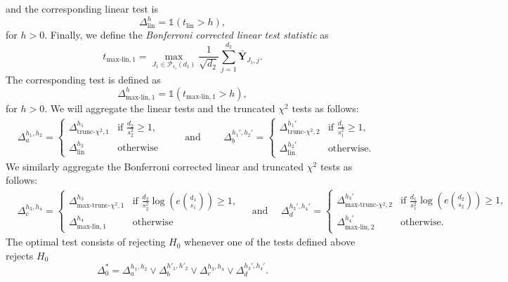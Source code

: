 \documentclass{article}
\newcommand{\Y}{\mathbf{Y}}
\newcommand{\one}{\mathds{1}}
\newcommand{\lin}{\text{lin}}
\newcommand{\chisqlin}{\text{trunc-$\chi^2$}}
\newcommand{\chisqmax}{\text{max-trunc-$\chi^2$}}
\newcommand{\linmax}{\text{max-lin}}
\theoremstyle{remark}
\begin{document}
and the corresponding linear test is
\begin{equation}
    \Delta^h_{\lin} = \one(t_\lin > h),
\end{equation}
for $h > 0$.
Finally, we define the \textit{Bonferroni corrected linear test statistic} as
\begin{equation}\label{eq_lin_max}
    \displaystyle t_{\linmax, 1} = \max_{J_1 \in \mathcal P_{s_1}\!(d_1)}\frac{1}{\sqrt{d_2}}\sum_{j = 1}^{d_2}\bar{\Y}_{J_1, j}.
\end{equation}
The corresponding test is defined as 
\begin{equation}
\Delta_{\linmax, 1}^h = \one(t_{\linmax, 1} > h),
\end{equation}
for $h > 0$. We will aggregate the linear tests and the truncated $\chi^2$ tests as follows:
\begin{align}
    &\Delta_a^{h_1,h_2} = \begin{cases}
        \Delta^{h_1}_{\chisqlin, 1} & \text{if  $\frac{d_2}{s_2^2} \geq 1$,} \\ \Delta^{h_2}_{\lin} & \text{otherwise}
    \end{cases} \qquad \text{ and } 
    \qquad \Delta_b^{h_1',h_2'} = \begin{cases}
        \Delta^{h_1'}_{\chisqlin, 2} & \text{if  $\frac{d_1}{s_1^2} \geq 1$,} \\ \Delta^{h_2'}_{\lin} & \text{otherwise.}
    \end{cases} \label{def_Delta_a_and_b}
\end{align}
We similarly aggregate the Bonferroni corrected linear and truncated $\chi^2$ tests as follows:
\begin{align*}
    &\Delta_c^{h_3,h_4} = \begin{cases}
        \Delta^{h_3}_{\chisqmax, 1} & \text{if  $\frac{d_2}{s_2^2}\log\!\left(e{d_1 \choose s_1}\right) \geq 1$,} \\ \Delta^{h_4}_{\linmax, 1} & \text{otherwise}
    \end{cases} \quad \text{ and } 
    \quad \Delta_d^{h_3',h_4'} = \begin{cases}
        \Delta^{h_3'}_{\chisqmax, 2} & \text{if  $\frac{d_1}{s_1^2}\log\!\left(e{d_2 \choose s_2}\right) \geq 1$,} \\ \Delta^{h_4'}_{\linmax, 2} & \text{otherwise}.
    \end{cases} 
\end{align*}
The optimal test consists of rejecting $H_0$ whenever one of the tests defined above rejects $H_0$
\begin{equation}\label{def_opt_test}
    \Delta^*_0 =  \Delta_a^{h_1, h_2} \lor \Delta_b^{h'_1, h'_2} \lor \Delta_c^{h_3, h_4} \lor  \Delta_d^{h_3', h_4'}.
\end{equation}
\end{document}

